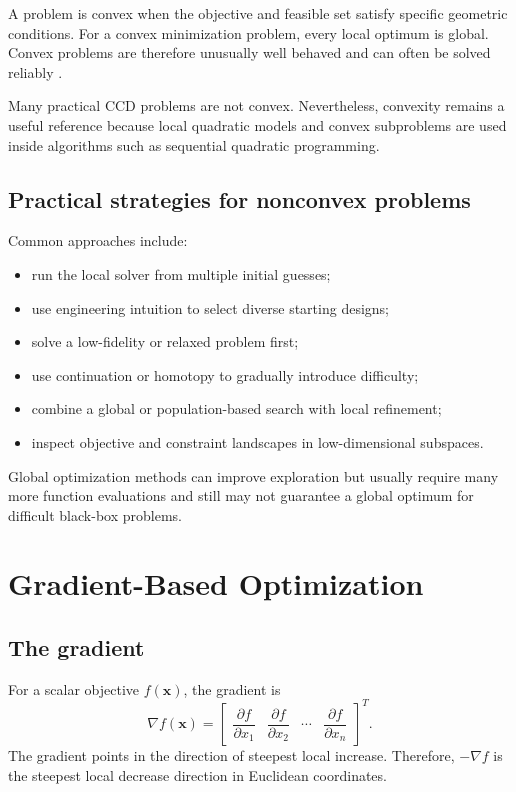 \documentclass[11pt]{article}
\newcommand{\vect}[1]{\boldsymbol{#1}}
\newcommand{\des}{\vect{x}}
\begin{document}
A problem is convex when the objective and feasible set satisfy specific geometric conditions. For a convex minimization problem, every local optimum is global. Convex problems are therefore unusually well behaved and can often be solved reliably \cite{boyd}.

Many practical CCD problems are not convex. Nevertheless, convexity remains a useful reference because local quadratic models and convex subproblems are used inside algorithms such as sequential quadratic programming.

\subsection{Practical strategies for nonconvex problems}

Common approaches include:
\begin{itemize}[leftmargin=1.4em]
  \item run the local solver from multiple initial guesses;
  \item use engineering intuition to select diverse starting designs;
  \item solve a low-fidelity or relaxed problem first;
  \item use continuation or homotopy to gradually introduce difficulty;
  \item combine a global or population-based search with local refinement;
  \item inspect objective and constraint landscapes in low-dimensional subspaces.
\end{itemize}

Global optimization methods can improve exploration but usually require many more function evaluations and still may not guarantee a global optimum for difficult black-box problems.

\section{Gradient-Based Optimization}

\subsection{The gradient}

For a scalar objective $f(\des)$, the gradient is
\begin{equation}
\nabla f(\des)=
\begin{bmatrix}
\dfrac{\partial f}{\partial x_1} &
\dfrac{\partial f}{\partial x_2} &
\cdots &
\dfrac{\partial f}{\partial x_n}
\end{bmatrix}^{T}.
\end{equation}
The gradient points in the direction of steepest local increase. Therefore, $-\nabla f$ is the steepest local decrease direction in Euclidean coordinates.
\end{document}
